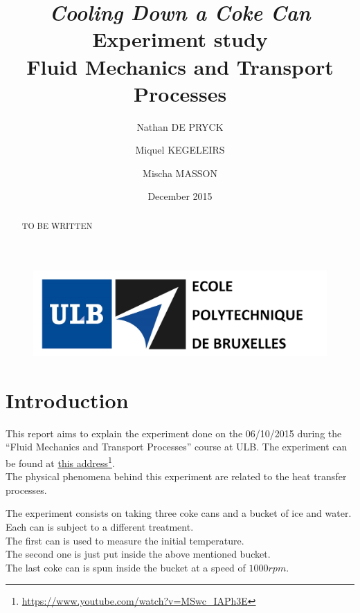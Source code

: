 \documentclass{report}
\title{\Huge\emph{Cooling Down a Coke Can}\\
	\LARGE Experiment study\\
	\vspace{11pt}
	\large Fluid Mechanics and Transport Processes}
\date{December 2015}
\author{Nathan DE PRYCK \and Miquel KEGELEIRS \and Mischa MASSON}
\begin{document}
	
	\begin{figure}[t]
		\includegraphics[width=15cm]{img/entete.PNG}
	\end{figure}
	
	\maketitle
	
	\renewcommand{\abstractname}{``Cooling down a coke can'' \\Experiment study by Nathan De Pryck, Miquel Kegeleirs and Mischa Masson\\ Université Libre de Bruxelles\\2015-2016.}
	
	\BgThispage
	
	\begin{abstract}
		TO BE WRITTEN
	\end{abstract}
	
	\clearpage
	
	\tableofcontents
	
	\chapter{Introduction}\label{intro}
	
	This report aims to explain the experiment done on the 06/10/2015 during the ``Fluid Mechanics and Transport Processes'' course at ULB. The experiment can be found at \hyperref{https://www.youtube.com/watch?v=MSwc_IAPh3E}{}{}{this address}\footnote{\url{https://www.youtube.com/watch?v=MSwc_IAPh3E}}.\\
	The physical phenomena behind this experiment are related to the heat transfer processes.

	The experiment consists on taking three coke cans and a bucket of ice and water. Each can is subject to a different treatment.\\
	The first can is used to measure the initial temperature.\\
	The second one is just put inside the above mentioned bucket.\\
	The last coke can is spun inside the bucket at a speed of $1000rpm$.
	
\end{document}
